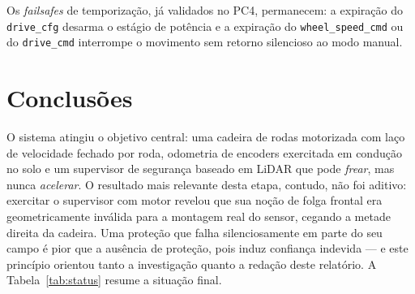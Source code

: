 \documentclass[conference]{IEEEtran}
\begin{document}
Os \emph{failsafes} de temporização, já validados no PC4, permanecem: a expiração
do \texttt{drive\_cfg} desarma o estágio de potência e a expiração do
\texttt{wheel\_speed\_cmd} ou do \texttt{drive\_cmd} interrompe o movimento sem
retorno silencioso ao modo manual.

\section{Conclusões}

O sistema atingiu o objetivo central: uma cadeira de rodas motorizada com laço de
velocidade fechado por roda, odometria de encoders exercitada em condução no solo
e um supervisor de segurança baseado em LiDAR que pode \emph{frear}, mas nunca
\emph{acelerar}. O resultado mais relevante desta etapa, contudo, não foi
aditivo: exercitar o supervisor com motor revelou que sua noção de folga frontal
era geometricamente inválida para a montagem real do sensor, cegando a metade
direita da cadeira. Uma proteção que falha silenciosamente em parte do seu campo
é pior que a ausência de proteção, pois induz confiança indevida --- e este
princípio orientou tanto a investigação quanto a redação deste relatório. A
Tabela~\ref{tab:status} resume a situação final.
\end{document}
